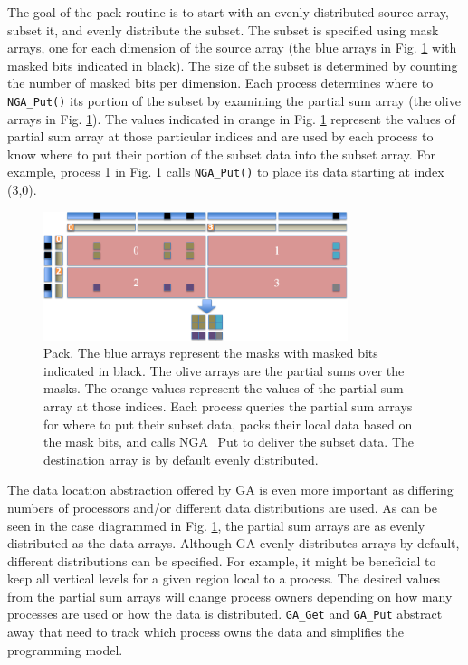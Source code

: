 The goal of the pack routine is to start with an evenly distributed source
array, subset it, and evenly distribute the subset.  The subset is specified
using mask arrays, one for each dimension of the source array (the blue arrays
in Fig. \ref{fig:pack} with masked bits indicated in black).  The size of the
subset is determined by counting the number of masked bits per dimension.
Each process determines where to \verb=NGA_Put()= its portion of the subset by
examining the partial sum array (the olive arrays in Fig. \ref{fig:pack}).
The values indicated in orange in Fig. \ref{fig:pack} represent the values of
partial sum array at those particular indices and are used by each process to
know where to put their portion of the subset data into the subset array.  For
example, process 1 in Fig. \ref{fig:pack} calls \verb=NGA_Put()= to place its
data starting at index (3,0).

\begin{figure}[!t]
\center
\includegraphics[width=3.5in]{images/pack}
\caption{Pack.  The blue arrays represent the masks with masked bits indicated
in black.  The olive arrays are the partial sums over the masks.  The orange
values represent the values of the partial sum array at those indices.  Each
process queries the partial sum arrays for where to put their subset data,
packs their local data based on the mask bits, and calls NGA\_Put to deliver
the subset data.  The destination array is by default evenly distributed.}
\label{fig:pack}
\end{figure}

The data location abstraction offered by GA is even more important as
differing numbers of processors and/or different data distributions are used.
As can be seen in the case diagrammed in Fig. \ref{fig:pack}, the partial sum
arrays are as evenly distributed as the data arrays.  Although GA evenly
distributes arrays by default, different distributions can be specified.  For
example, it might be beneficial to keep all vertical levels for a given region
local to a process.  The desired values from the partial sum arrays will
change process owners depending on how many processes are used or how the data
is distributed.  \verb+GA_Get+ and \verb+GA_Put+ abstract away that need to
track which process owns the data and simplifies the programming model.
